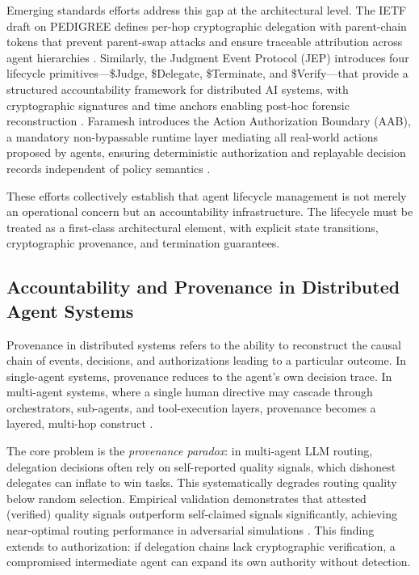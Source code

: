 Emerging standards efforts address this gap at the architectural level. The IETF draft on PEDIGREE defines per-hop cryptographic delegation with parent-chain tokens that prevent parent-swap attacks and ensure traceable attribution across agent hierarchies \cite{PEDIGREE:2024}. Similarly, the Judgment Event Protocol (JEP) introduces four lifecycle primitives—\$Judge, \$Delegate, \$Terminate, and \$Verify—that provide a structured accountability framework for distributed AI systems, with cryptographic signatures and time anchors enabling post-hoc forensic reconstruction \cite{JEP:2026}. Faramesh introduces the Action Authorization Boundary (AAB), a mandatory non-bypassable runtime layer mediating all real-world actions proposed by agents, ensuring deterministic authorization and replayable decision records independent of policy semantics \cite{Faramesh:2026}.

These efforts collectively establish that agent lifecycle management is not merely an operational concern but an accountability infrastructure. The lifecycle must be treated as a first-class architectural element, with explicit state transitions, cryptographic provenance, and termination guarantees.


\subsection{Accountability and Provenance in Distributed Agent Systems}

Provenance in distributed systems refers to the ability to reconstruct the causal chain of events, decisions, and authorizations leading to a particular outcome. In single-agent systems, provenance reduces to the agent's own decision trace. In multi-agent systems, where a single human directive may cascade through orchestrators, sub-agents, and tool-execution layers, provenance becomes a layered, multi-hop construct \cite{HDP:2026}.

The core problem is the \emph{provenance paradox}: in multi-agent LLM routing, delegation decisions often rely on self-reported quality signals, which dishonest delegates can inflate to win tasks. This systematically degrades routing quality below random selection. Empirical validation demonstrates that attested (verified) quality signals outperform self-claimed signals significantly, achieving near-optimal routing performance in adversarial simulations \cite{ProvenanceParadox:2026}. This finding extends to authorization: if delegation chains lack cryptographic verification, a compromised intermediate agent can expand its own authority without detection.

